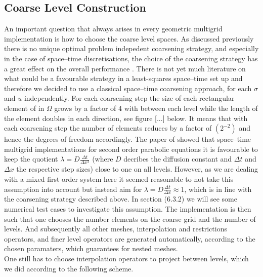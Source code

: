 \documentclass[../draft_1.tex]{subfiles}
\begin{document}
\subsection{Coarse Level Construction}
 An important question that always arises in every geometric multigrid implementation is how to choose the coarse level spaces. As discussed previously there is no unique optimal problem indepedent coarsening strategy, and especially in the case of space--time discretisations, the choice of the coarsening strategy has a great effect on the overall performance \cite{gander2016analysis}. There is not yet much literature on what could be a favourable strategy in a least-squares space--time set up and therefore we decided to use a classical space--time coarsening approach, for each $\sigma$ and $u$ independently. For each coarsening step the size of each rectangular element of in $\Omega$ grows by a factor of 4 with between each level while the length of the element doubles in each direction, see figure [...] below. It means that with each coarsening step the number of elements reduces by a factor of $(2^{-2})$ and hence the degrees of freedom accordingly.
 The paper of \cite{gander2016analysis} showed that space--time  multigrid implementations for second order parabolic equations it is favourable to keep the quotient $\lambda = D \frac{\Delta t}{\Delta x^2}$ (where $D$ decribes the diffusion constant and $\Delta t$ and $\Delta x$ the respective step sizes) close to one on all levels. However, as we are dealing with a mixed first order system here it seemed reasonable to not take this assumption into account but instead aim for $ \lambda = D \frac{\Delta t}{\Delta x} \approx 1$, which is in line with the coarsening strategy described above. In section (6.3.2) we will see some numerical test cases to investigate this assumption. %
 The implementation is then such that one chooses the number elements on the coarse grid and the number of levels. And subsequently all other meshes, interpolation and restrictions operators, and finer level operators are generated automatically, according to the chosen paramaters, which guarantees for nested meshes.
\smallskip
\\
One still has to choose interpolation operators to project between levels, which we did according to the following scheme.  \\
\end{document}
